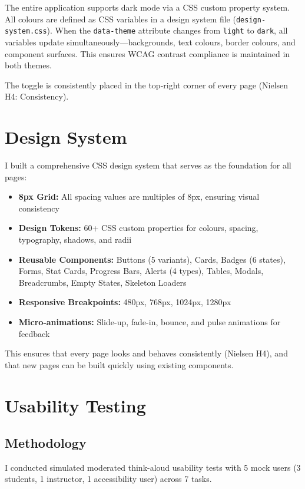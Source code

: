 \documentclass[12pt, a4paper]{article}
\begin{document}
The entire application supports dark mode via a CSS custom property system. All colours are defined as CSS variables in a design system file (\texttt{design-system.css}). When the \texttt{data-theme} attribute changes from \texttt{light} to \texttt{dark}, all variables update simultaneously—backgrounds, text colours, border colours, and component surfaces. This ensures WCAG contrast compliance is maintained in both themes.

The toggle is consistently placed in the top-right corner of every page (Nielsen H4: Consistency).

\section{Design System}

I built a comprehensive CSS design system that serves as the foundation for all pages:

\begin{itemize}[noitemsep]
  \item \textbf{8px Grid:} All spacing values are multiples of 8px, ensuring visual consistency
  \item \textbf{Design Tokens:} 60+ CSS custom properties for colours, spacing, typography, shadows, and radii
  \item \textbf{Reusable Components:} Buttons (5 variants), Cards, Badges (6 states), Forms, Stat Cards, Progress Bars, Alerts (4 types), Tables, Modals, Breadcrumbs, Empty States, Skeleton Loaders
  \item \textbf{Responsive Breakpoints:} 480px, 768px, 1024px, 1280px
  \item \textbf{Micro-animations:} Slide-up, fade-in, bounce, and pulse animations for feedback
\end{itemize}

This ensures that every page looks and behaves consistently (Nielsen H4), and that new pages can be built quickly using existing components.

\section{Usability Testing}

\subsection{Methodology}
I conducted simulated moderated think-aloud usability tests with 5 mock users (3 students, 1 instructor, 1 accessibility user) across 7 tasks.
\end{document}
